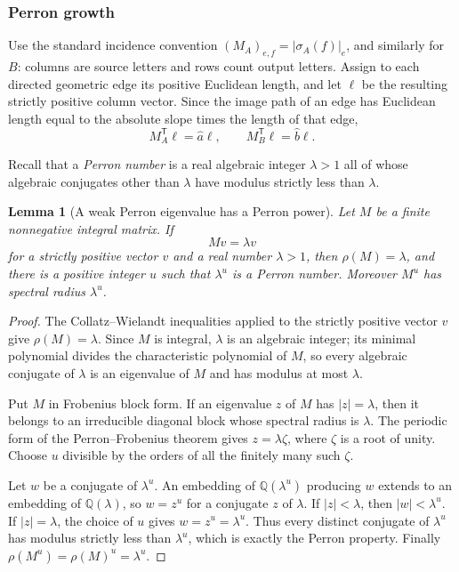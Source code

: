 \documentclass[11pt]{article}
\newtheorem{lemma}[theorem]{Lemma}
\theoremstyle{definition}
\theoremstyle{remark}
\begin{document}
\subsubsection{Perron growth}

Use the standard incidence convention
$(M_A)_{e,f}=|\sigma_A(f)|_e$, and similarly for $B$: columns are source
letters and rows count output letters.  Assign to each directed geometric
edge its positive Euclidean length, and let $\boldsymbol\ell$ be the
resulting strictly positive column vector.  Since the image path of an edge
has Euclidean length equal to the absolute slope times the length of that
edge,
\begin{equation}\label{term:eq:length-eigenvectors}
 M_A^{\mathsf T}\boldsymbol\ell=\widehat a\boldsymbol\ell,\qquad
 M_B^{\mathsf T}\boldsymbol\ell=\widehat b\boldsymbol\ell.
\end{equation}

Recall that a \emph{Perron number} is a real algebraic integer
\(\lambda>1\) all of whose algebraic conjugates other than \(\lambda\) have
modulus strictly less than \(\lambda\).

\begin{lemma}[A weak Perron eigenvalue has a Perron power]
\label{term:lem:perron-power}
Let \(M\) be a finite nonnegative integral matrix.  If
\[
 Mv=\lambda v
\]
for a strictly positive vector \(v\) and a real number \(\lambda>1\), then
\(\rho(M)=\lambda\), and there is a positive integer \(u\) such that
\(\lambda^u\) is a Perron number.  Moreover \(M^u\) has spectral radius
\(\lambda^u\).
\end{lemma}

\begin{proof}
The Collatz--Wielandt inequalities applied to the strictly positive vector
\(v\) give \(\rho(M)=\lambda\).  Since \(M\) is integral, \(\lambda\) is an
algebraic integer; its minimal polynomial divides the characteristic
polynomial of \(M\), so every algebraic conjugate of \(\lambda\) is an
eigenvalue of \(M\) and has modulus at most \(\lambda\).

Put \(M\) in Frobenius block form.  If an eigenvalue \(z\) of \(M\) has
\(|z|=\lambda\), then it belongs to an irreducible diagonal block whose
spectral radius is \(\lambda\).  The periodic form of the Perron--Frobenius
theorem gives \(z=\lambda\zeta\), where \(\zeta\) is a root of unity.  Choose
\(u\) divisible by the orders of all the finitely many such \(\zeta\).

Let \(w\) be a conjugate of \(\lambda^u\).  An embedding of
\(\mathbb Q(\lambda^u)\) producing \(w\) extends to an embedding of
\(\mathbb Q(\lambda)\), so \(w=z^u\) for a conjugate \(z\) of \(\lambda\).
If \(|z|<\lambda\), then \(|w|<\lambda^u\).  If \(|z|=\lambda\), the
choice of \(u\) gives \(w=z^u=\lambda^u\).  Thus every distinct conjugate of
\(\lambda^u\) has modulus strictly less than \(\lambda^u\), which is exactly
the Perron property.  Finally
\(\rho(M^u)=\rho(M)^u=\lambda^u\).
\end{proof}
\end{document}
